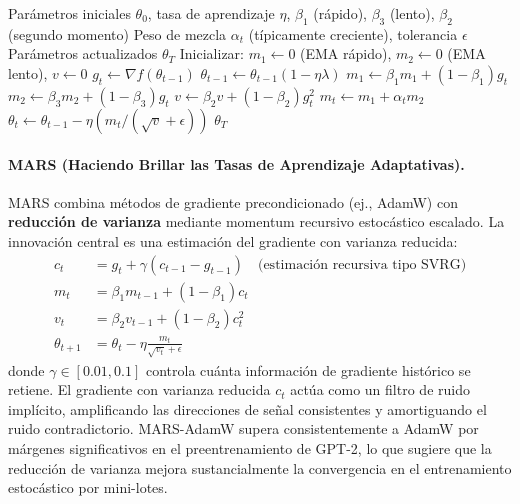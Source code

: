 \begin{algorithm}[H]
\caption{AdEMAMix (Mezcla de Promedios Móviles Exponenciales)}
\label{alg:ademamix}
\begin{algorithmic}[1]
\Require Parámetros iniciales $\theta_0$, tasa de aprendizaje $\eta$, $\beta_1$ (rápido), $\beta_3$ (lento), $\beta_2$ (segundo momento)
\Require Peso de mezcla $\alpha_t$ (típicamente creciente), tolerancia $\epsilon$
\Ensure Parámetros actualizados $\theta_T$
\State Inicializar: $m_1 \gets 0$ (EMA rápido), $m_2 \gets 0$ (EMA lento), $v \gets 0$
    \State $g_t \gets \nabla f(\theta_{t-1})$
        \State $\theta_{t-1} \gets \theta_{t-1}(1 - \eta\lambda)$
    \EndIf
    \State $m_1 \gets \beta_1 m_1 + (1-\beta_1) g_t$ 
    \State $m_2 \gets \beta_3 m_2 + (1-\beta_3) g_t$ 
    \State $v \gets \beta_2 v + (1-\beta_2) g_t^2$
    \State $m_t \gets m_1 + \alpha_t m_2$ 
    \State $\theta_t \gets \theta_{t-1} - \eta (m_t / (\sqrt{v} + \epsilon))$
\EndFor
\Return $\theta_T$
\end{algorithmic}
\end{algorithm}

\paragraph{MARS (Haciendo Brillar las Tasas de Aprendizaje Adaptativas).}
MARS combina métodos de gradiente precondicionado (ej., AdamW) con \textbf{reducción de varianza} mediante momentum recursivo estocástico escalado. La innovación central es una estimación del gradiente con varianza reducida:
\begin{align}
c_t &= g_t + \gamma(c_{t-1} - g_{t-1}) \quad\text{(estimación recursiva tipo SVRG)} \\
m_t &= \beta_1 m_{t-1} + (1-\beta_1)c_t \\
v_t &= \beta_2 v_{t-1} + (1-\beta_2)c_t^2 \\
\theta_{t+1} &= \theta_t - \eta\frac{m_t}{\sqrt{v_t}+\epsilon}
\end{align}
donde $\gamma \in [0.01, 0.1]$ controla cuánta información de gradiente histórico se retiene. El gradiente con varianza reducida $c_t$ actúa como un filtro de ruido implícito, amplificando las direcciones de señal consistentes y amortiguando el ruido contradictorio. MARS-AdamW supera consistentemente a AdamW por márgenes significativos en el preentrenamiento de GPT-2, lo que sugiere que la reducción de varianza mejora sustancialmente la convergencia en el entrenamiento estocástico por mini-lotes.

